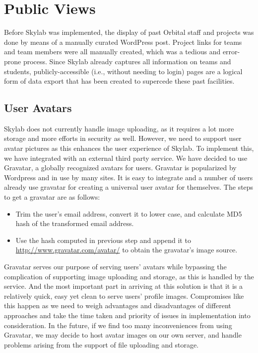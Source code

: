\chapter{Public Views} \label{publicprofile}

Before Skylab was implemented, the display of past Orbital staff and projects was done by means of a manually curated WordPress post.   Project links for teams and team members were all manually created, which was a tedious and error-prone process. Since Skylab already captures all information on teams and students, publicly-accessible (i.e., without needing to login) pages are a logical form of data export that has been created to supercede these past facilities.

\section{User Avatars} \label{useravatar}

Skylab does not currently handle image uploading, as it requires a lot more storage and more efforts in security as well. However, we need to support user avatar pictures as this enhances the user experience of Skylab.  To implement this, we have integrated with an external third party service.   We have decided to use Gravatar, a globally recognized avatars for users\cite{citationgravatar}. Gravatar is popularized by Wordpress and in use by many sites.  It is easy to integrate and a number of users already use gravatar for creating a universal user avatar for themselves.  The steps to get a gravatar are as follows:

\begin{itemize}
  \item Trim the user's email address, convert it to lower case, and calculate MD5 hash of the transformed email address.
  \item Use the hash computed in previous step and append it to \url{http://www.gravatar.com/avatar/} to obtain the gravatar's image source.
\end{itemize}

Gravatar serves our purpose of serving users' avatars while bypassing the complication of supporting image uploading and storage, as this is handled by the service. And the most important part in arriving at this solution is that it is a relatively quick, easy yet clean to serve users' profile images. Compromises like this happen as we need to weigh advantages and disadvantages of different approaches and take the time taken and priority of issues in implementation into consideration. In the future, if we find too many inconveniences from using Gravatar, we may decide to host avatar images on our own server, and handle problems arising from the support of file uploading and storage.
